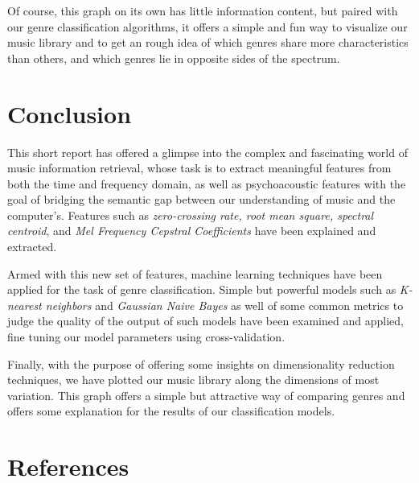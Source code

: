 \documentclass[12pt]{article}
\begin{document}
Of course, this graph on its own has little information content, but paired with our genre classification algorithms, it offers a simple and fun way to visualize our music library and to get an rough idea of which genres share more characteristics than others, and which genres lie in opposite sides of the spectrum.
\medskip

\section*{Conclusion}
This short report has offered a glimpse into the complex and fascinating world of music information retrieval, whose task is to extract meaningful features from both the time and frequency domain, as well as psychoacoustic features with the goal of bridging the semantic gap between our understanding of music and the computer's. Features such as \textit{zero-crossing rate, root mean square, spectral centroid}, and \textit{Mel Frequency Cepstral Coefficients} have been explained and extracted.
\medskip

Armed with this new set of features, machine learning techniques have been applied for the task of genre classification. Simple but powerful models such as \textit{K-nearest neighbors} and \textit{Gaussian Naive Bayes} as well of some common metrics to judge the quality of the output of such models have been examined and applied, fine tuning our model parameters using cross-validation.
\medskip

Finally, with the purpose of offering some insights on dimensionality reduction techniques, we have plotted our music library along the dimensions of most variation. This graph offers a simple but attractive way of comparing genres and offers some explanation for the results of our classification models.
\medskip

\newpage
\section*{References}
\end{document}
